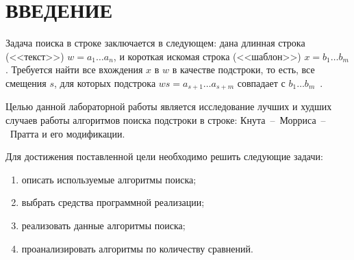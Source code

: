 \chapter*{\hfill{\centering  ВВЕДЕНИЕ}\hfill}

Задача поиска в строке заключается в следующем: дана длинная строка (<<текст>>) $w = a_1 \dots a_n$, и короткая искомая строка (<<шаблон>>) $x = b_1 \dots b_m$. Требуется найти все вхождения $x$ в $w$ в качестве подстроки, то есть, все смещения $s$, для которых подстрока $ws = a_{s + 1} \dots a_{s + m}$ совпадает с $b_1 \dots b_m$~\cite{lectures1}.

Целью данной лабораторной работы является исследование лучших и худших случаев работы алгоритмов поиска подстроки в строке: Кнута~--~Морриса~--~Пратта и его модификации.

Для достижения поставленной цели необходимо решить следующие задачи:
\begin{enumerate}
	\item описать используемые алгоритмы поиска;
	\item выбрать средства программной реализации;
	\item реализовать данные алгоритмы поиска;
	\item проанализировать алгоритмы по количеству сравнений.
\end{enumerate}
